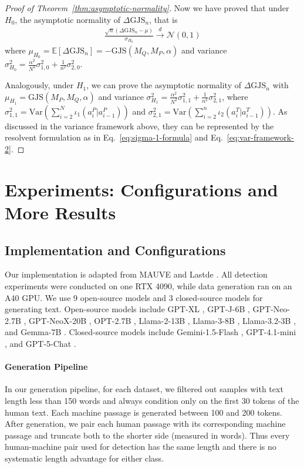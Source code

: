 \documentclass{article}
\theoremstyle{plain}
\theoremstyle{definition}
\theoremstyle{remark}
\begin{document}
\begin{proof}[Proof of Theorem~\ref{thm:asymptotic-normality}]
Now we have proved that under $H_0$, the asymptotic normality of $\Delta \text{GJS}_n$, that is 
\begin{align}
    \frac{\sqrt{n}(\Delta \text{GJS}_n-\mu)}{\sigma_{H_0}}\xrightarrow{d}\mathcal{N}(0,1)
\end{align}
where $\mu_{H_0}=\mathbb{E}[\Delta \text{GJS}_n]=-\text{GJS} (M_Q,M_P,\alpha)$ and variance $\sigma_{H_0}^2=\frac{\alpha^2}{N^2}\sigma_{1,0}^2+\frac{1}{n^2}\sigma_{2,0}^2$.

Analogously, under $H_1$, we can prove  the asymptotic normality of $\Delta \text{GJS}_n$ with $\mu_{H_1}=\text{GJS} (M_P,M_Q,\alpha)$ and variance $\sigma_{H_1}^2=\frac{\alpha^2}{N^2}\sigma_{1,1}^2+\frac{1}{n^2}\sigma_{2,1}^2$, where $\sigma_{1,1}^2 = \text{Var} ( \sum_{i=2}^{N} \iota_1(a_i^P|a_{i-1}^P))$ and $\sigma_{2,1}^2 = \text{Var} (\sum_{i=2}^{n} \iota_2(a^T_{i}|a_{i-1}^T))$. As discussed in the variance framework above, they can be represented by the resolvent formulation as in Eq.~\ref{eq:sigma-1-formula} and Eq.~\ref{eq:var-framework-2}.




\end{proof}

\newpage

\section{Experiments: Configurations and More Results}
\subsection{Implementation and Configurations} \label{sec:exp-configuration}
Our implementation is adapted from MAUVE \citep{pillutla2023mauvescoresgenerativemodels} and Lastde \citep{xu2025trainingfree}. All detection experiments were conducted on one RTX 4090, while data generation ran on an A40 GPU.
We use 9 open-source models and 3 closed-source models for generating text.
Open-source models include GPT-XL \citep{radford2019gpt2}, GPT-J-6B \citep{wang2021gptj6b}, GPT-Neo-2.7B \citep{gptneo2021}, GPT-NeoX-20B \citep{black2022gptneox20b}, OPT-2.7B \citep{zhang2022opt}, Llama-2-13B \citep{touvron2023llama2}, Llama-3-8B \citep{dubey2024llama3}, Llama-3.2-3B \citep{llama32docs2024}, and Gemma-7B \citep{gemma2024}. Closed-source models include Gemini-1.5-Flash \citep{gemini15_2024}, GPT-4.1-mini \citep{openai2025gpt41}, and GPT-5-Chat \citep{openai2025gpt5chat}. 


\paragraph{Generation Pipeline} In our generation pipeline, for each dataset, we filtered out samples with text length less than 150 words and always condition only on the first 30 tokens of the human text. Each machine passage is generated between 100 and 200 tokens. After generation, we pair each human passage with its corresponding machine passage and truncate both to the shorter side (measured in words). Thus every human-machine pair used for detection has the same length and there is no systematic length advantage for either class.
\end{document}
